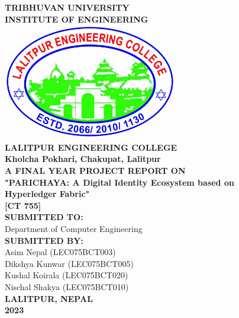 {
	\thispagestyle{empty}
	\centering
   \fontsize{14pt}{14pt}\selectfont
        	\textbf{\MakeUppercase{Tribhuvan University}}\\
        	\textbf{\MakeUppercase{INSTITUTE OF ENGINEERING}}\\[0.5cm]
        	\includegraphics[width=3in]{images/LECLogo.jpg}\\[0.3cm]
        	\textbf{\MakeUppercase{Lalitpur Engineering College}}\\
    	\textbf{Kholcha Pokhari, Chakupat, Lalitpur}\\[1.4cm]
    	
    	\textbf{\MakeUppercase{A final year project report on}}\\
    	\textbf{"\MakeUppercase{Parichaya}: A Digital Identity Ecosystem based on \\ Hyperledger Fabric"}\\
    	\textbf{[CT 755]}\\[2cm]
    	
    	\textbf{\MakeUppercase{Submitted To:}}\\
    	{Department of Computer Engineering}\\[1.2cm]
    	\textbf{\MakeUppercase{Submitted By:}}\\
            {
        	{{Asim Nepal (LEC075BCT003)}}\\
        	{{Dikshya Kunwar (LEC075BCT005)}}\\
        	{{Kushal Koirala (LEC075BCT020)}}\\
        	{{Nischal Shakya (LEC075BCT010)}}\\[1.2cm]
            }	
     \textbf{\MakeUppercase{Lalitpur, Nepal}}\\
    	\textbf{2023}\\
}
